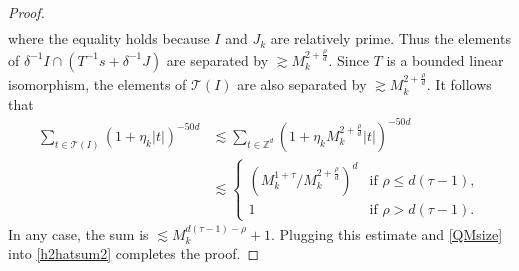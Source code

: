 \documentclass[10pt,a4paper]{amsart}
\def\ZZ{\mathbb{Z}}
\begin{document}
\begin{proof}
\begin{align}
\end{align}
where the equality holds because $I$ and $J_k$ are relatively prime. 
Thus the elements of 
$\delta^{-1} I \cap (T^{-1} s + \delta^{-1} J)$ 
are separated by 
$\gtrsim 
M_k^{2+\frac{\rho}{d}}.$ 
Since $T$ is a bounded linear isomorphism, 
the elements of $\mathcal{T}(I)$ 
are also separated by $\gtrsim M_k^{2+\frac{\rho}{d}}$. 
It follows that 
\begin{align*}
\sum_{t \in \mathcal{T}(I)} (1+\eta_k|t|)^{-50d}
&\lesssim
\sum_{t \in \ZZ^d} (1+\eta_k M_k^{2+\frac{\rho}{d}}|t|)^{-50d} 
\\
&\lesssim 
\left\{\begin{array}{cc}
    (M_k^{1+\tau} / M_k^{2+\frac{\rho}{d}})^d  & \text{if } \rho \leq d(\tau-1),  \\
    1 & \text{if } \rho > d(\tau-1). 
\end{array}\right.
\end{align*}
In any case, the sum is $\lesssim M_k^{d(\tau-1) -\rho}+1$. 
Plugging this estimate and \eqref{QMsize} into \eqref{h2hatsum2} 
completes the proof. 
\end{proof}
\end{document}

